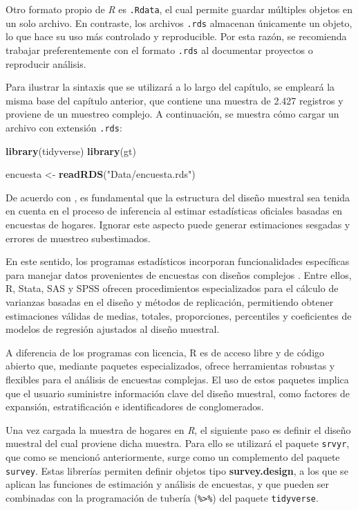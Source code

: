 \documentclass[
  spanish,
  12pt,
]{book}
\newenvironment{Shaded}{\begin{snugshade}}{\end{snugshade}}
\newcommand{\FunctionTok}[1]{\textcolor[rgb]{0.13,0.29,0.53}{\textbf{#1}}}
\newcommand{\NormalTok}[1]{#1}
\newcommand{\OtherTok}[1]{\textcolor[rgb]{0.56,0.35,0.01}{#1}}
\newcommand{\StringTok}[1]{\textcolor[rgb]{0.31,0.60,0.02}{#1}}
\begin{document}
Otro formato propio de \emph{R} es \texttt{.Rdata}, el cual permite guardar múltiples objetos en un solo archivo. En contraste, los archivos \texttt{.rds} almacenan únicamente un objeto, lo que hace su uso más controlado y reproducible. Por esta razón, se recomienda trabajar preferentemente con el formato \texttt{.rds} al documentar proyectos o reproducir análisis.

Para ilustrar la sintaxis que se utilizará a lo largo del capítulo, se empleará la misma base del capítulo anterior, que contiene una muestra de 2.427 registros y proviene de un muestreo complejo. A continuación, se muestra cómo cargar un archivo con extensión \texttt{.rds}:

\begin{Shaded}
\begin{Highlighting}[]
\FunctionTok{library}\NormalTok{(tidyverse)}
\FunctionTok{library}\NormalTok{(gt)}

\NormalTok{encuesta }\OtherTok{\textless{}{-}} \FunctionTok{readRDS}\NormalTok{(}\StringTok{"Data/encuesta.rds"}\NormalTok{)}
\end{Highlighting}
\end{Shaded}

De acuerdo con \citet[sección 7.8]{ONUDeff}, es fundamental que la estructura del diseño muestral sea tenida en cuenta en el proceso de inferencia al estimar estadísticas oficiales basadas en encuestas de hogares. Ignorar este aspecto puede generar estimaciones sesgadas y errores de muestreo subestimados.

En este sentido, los programas estadísticos incorporan funcionalidades específicas para manejar datos provenientes de encuestas con diseños complejos \citep[apéndice A]{heeringa2017applied}. Entre ellos, R, Stata, SAS y SPSS ofrecen procedimientos especializados para el cálculo de varianzas basadas en el diseño y métodos de replicación, permitiendo obtener estimaciones válidas de medias, totales, proporciones, percentiles y coeficientes de modelos de regresión ajustados al diseño muestral.

A diferencia de los programas con licencia, R es de acceso libre y de código abierto que, mediante paquetes especializados, ofrece herramientas robustas y flexibles para el análisis de encuestas complejas. El uso de estos paquetes implica que el usuario suministre información clave del diseño muestral, como factores de expansión, estratificación e identificadores de conglomerados.

Una vez cargada la muestra de hogares en \emph{R}, el siguiente paso es definir el diseño muestral del cual proviene dicha muestra. Para ello se utilizará el paquete \texttt{srvyr}, que como se mencionó anteriormente, surge como un complemento del paquete \texttt{survey}. Estas librerías permiten definir objetos tipo \textbf{survey.design}, a los que se aplican las funciones de estimación y análisis de encuestas, y que pueden ser combinadas con la programación de tubería (\texttt{\%\textgreater{}\%}) del paquete \texttt{tidyverse}.
\end{document}
